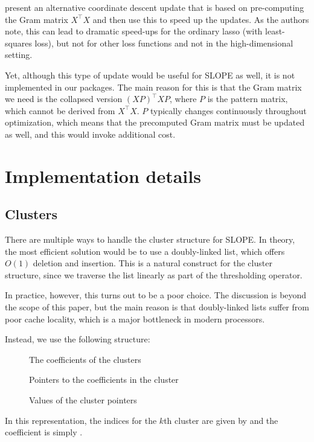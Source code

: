 \documentclass[article]{jss}
\begin{document}
\citet{friedman2010} present an alternative coordinate descent update that is
based on pre-computing the Gram matrix \(X^\intercal X\) and then use this to
speed up the updates. As the authors note, this can lead to dramatic speed-ups
for the ordinary lasso (with least-squares loss), but not for other loss
functions and not in the high-dimensional setting.

Yet, although this type of update would be useful for SLOPE as well, it is not
implemented in our packages. The main reason for this is that the Gram matrix
we need is the collapsed version \((XP)^\intercal XP\), where \(P\) is the
pattern matrix, which cannot be derived from \(X^\intercal X\). \(P\) typically
changes continuously throughout optimization, which means that the precomputed
Gram matrix must be updated as well, and this would invoke additional cost.

\section{Implementation details}
\label{sec:implementation-details}

\subsection{Clusters}
\label{sec:clusters}

There are multiple ways to handle the cluster structure for SLOPE.
In theory, the most efficient solution would be to use a
doubly-linked list, which offers \(O(1)\) deletion and insertion.
This is a natural construct for the cluster structure, since we
traverse the list linearly as part of the thresholding operator.

In practice, however, this turns out to be a poor choice.
The discussion is beyond the scope of this paper, but the main
reason is that doubly-linked lists suffer from poor cache
locality, which is a major bottleneck in modern processors.

Instead, we use the following structure:

\begin{description}
  \item[] The coefficients of the clusters
  \item[] Pointers to the coefficients in the cluster
  \item[] Values of the cluster pointers
\end{description}

In this representation, the indices for the \(k\)th cluster
are given by  and the coefficient is simply .
\end{document}
